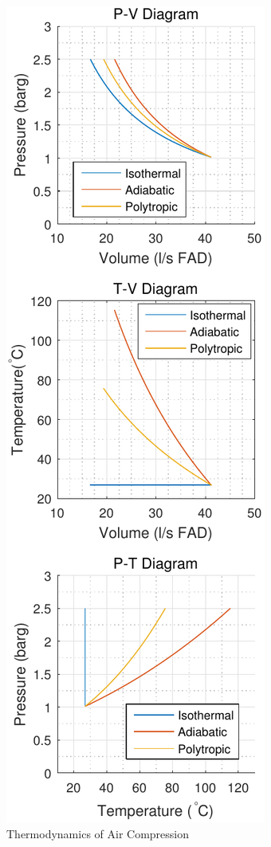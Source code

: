 \begin{figure}
\includegraphics[height = \textheight]{./Images/Compression_ThermoDiagrams.pdf}
\caption{Thermodynamics of Air Compression}
\label{fig:thermocomp}
\end{figure}

